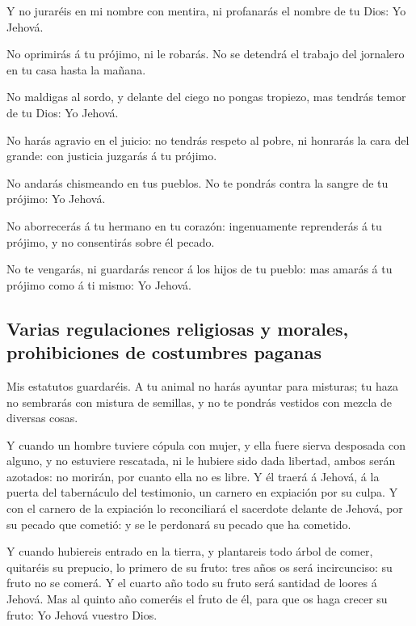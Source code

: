  Y no juraréis en mi nombre con mentira, ni profanarás el
nombre de tu Dios: Yo Jehová.

 No oprimirás á tu prójimo, ni le robarás. No se detendrá
el trabajo del jornalero en tu casa hasta la mañana.

 No maldigas al sordo, y delante del ciego no pongas
tropiezo, mas tendrás temor de tu Dios: Yo Jehová.

 No harás agravio en el juicio: no tendrás respeto al
pobre, ni honrarás la cara del grande: con justicia juzgarás á tu
prójimo.

 No andarás chismeando en tus pueblos. No te pondrás
contra la sangre de tu prójimo: Yo Jehová.

 No aborrecerás á tu hermano en tu corazón: ingenuamente
reprenderás á tu prójimo, y no consentirás sobre él pecado.

 No te vengarás, ni guardarás rencor á los hijos de tu
pueblo: mas amarás á tu prójimo como á ti mismo: Yo Jehová.

\hypertarget{varias-regulaciones-religiosas-y-morales-prohibiciones-de-costumbres-paganas}{%
\subsection{Varias regulaciones religiosas y morales, prohibiciones de
costumbres
paganas}\label{varias-regulaciones-religiosas-y-morales-prohibiciones-de-costumbres-paganas}}

 Mis estatutos guardaréis. A tu animal no harás ayuntar
para misturas; tu haza no sembrarás con mistura de semillas, y no te
pondrás vestidos con mezcla de diversas cosas.

 Y cuando un hombre tuviere cópula con mujer, y ella
fuere sierva desposada con alguno, y no estuviere rescatada, ni le
hubiere sido dada libertad, ambos serán azotados: no morirán, por cuanto
ella no es libre.  Y él traerá á Jehová, á la puerta del
tabernáculo del testimonio, un carnero en expiación por su culpa.
 Y con el carnero de la expiación lo reconciliará el
sacerdote delante de Jehová, por su pecado que cometió: y se le
perdonará su pecado que ha cometido.

 Y cuando hubiereis entrado en la tierra, y plantareis
todo árbol de comer, quitaréis su prepucio, lo primero de su fruto: tres
años os será incircunciso: su fruto no se comerá.  Y el
cuarto año todo su fruto será santidad de loores á Jehová.
 Mas al quinto año comeréis el fruto de él, para que os
haga crecer su fruto: Yo Jehová vuestro Dios.

